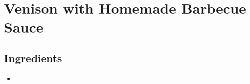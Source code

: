 \thispagestyle{fancy}
\section{Venison with Homemade Barbecue Sauce}
\AddToShipoutPicture*{\VenisonBBQ}

\subsection*{Ingredients}
\begin{multicols}{3}
	\begin{itemize}
		\item 
	\end{itemize}
\end{multicols}